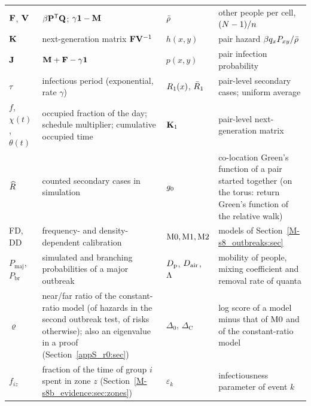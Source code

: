 \begin{table}[tbp]
\begin{tabular}{@{}l>{\raggedright\arraybackslash}p{}l>{\raggedright\arraybackslash}p{}@{}}
    $\mathbf{F}$, $\mathbf{V}$ & $\beta\mathbf{P}^{\mathsf{T}}\mathbf{Q}$; $\gamma\mathbf{1}-\mathbf{M}$ & $\bar{\rho}$ & other people per cell, $(N-1)/n$ \\
    $\mathbf{K}$ & next-generation matrix $\mathbf{F}\mathbf{V}^{-1}$ & $h(x,y)$ & pair hazard $\beta q_xP_{xy}/\bar{\rho}$ \\
    $\mathbf{J}$ & $\mathbf{M}+\mathbf{F}-\gamma\mathbf{1}$ & $p(x,y)$ & pair infection probability \\
    $\tau$ & infectious period (exponential, rate $\gamma$) & $R_1(x)$, $\bar{R}_1$ & pair-level secondary cases; uniform average \\
    $f$, $\chi(t)$, $\theta(t)$ & occupied fraction of the day; schedule multiplier; cumulative occupied time & $\mathbf{K}_1$ & pair-level next-generation matrix \\
    $\widehat{R}$ & counted secondary cases in simulation & $g_0$ & co-location Green's function of a pair started together (on the torus: return Green's function of the relative walk) \\
    FD, DD & frequency- and density-dependent calibration & $\mathrm{M0},\mathrm{M1},\mathrm{M2}$ & models of Section~\ref{M-s8_outbreaks:sec} \\
    $P_{\mathrm{maj}}$, $P_{\mathrm{br}}$ & simulated and branching probabilities of a major outbreak & $D_{\mathrm{p}}$, $D_{\mathrm{air}}$, $\Lambda$ & mobility of people, mixing coefficient and removal rate of quanta \\
    $\varrho$ & near/far ratio of the constant-ratio model (of hazards in the second outbreak test, of risks otherwise); also an eigenvalue in a proof (Section~\ref{appS_r0:sec}) & $\Delta_0$, $\Delta_{\mathrm{C}}$ & log score of a model minus that of $\mathrm{M0}$ and of the constant-ratio model \\
    $f_{iz}$ & fraction of the time of group $i$ spent in zone $z$ (Section~\ref{M-s8b_evidence:sec:zones}) & $\varepsilon_k$ & infectiousness parameter of event $k$ \\
    \bottomrule
  \end{tabular}
\end{table}
